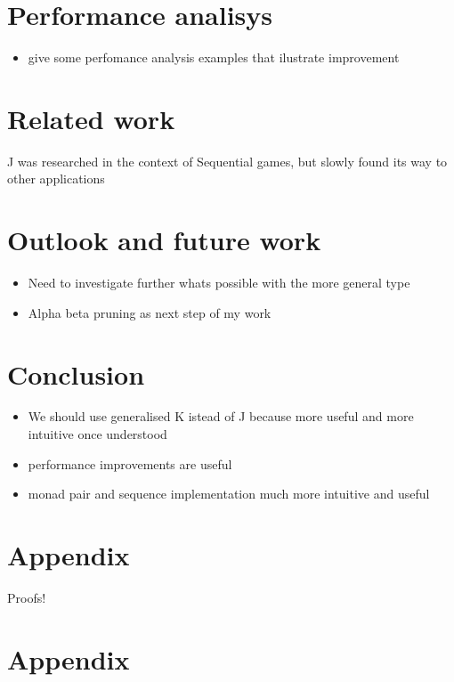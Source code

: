 \documentclass[runningheads]{llncs}
\providecommand{\tightlist}{%
  \setlength{\itemsep}{0pt}\setlength{\parskip}{0pt}}
\begin{document}
\section{Performance analisys}\label{performance-analisys}

\begin{itemize}
\tightlist
\item
  give some perfomance analysis examples that ilustrate improvement
\end{itemize}

\section{Related work}\label{related-work}

J was researched in the context of Sequential games, but slowly found
its way to other applications

\section{Outlook and future work}\label{outlook-and-future-work}

\begin{itemize}
\tightlist
\item
  Need to investigate further whats possible with the more general type
\item
  Alpha beta pruning as next step of my work
\end{itemize}

\section{Conclusion}\label{conclusion}

\begin{itemize}
\tightlist
\item
  We should use generalised K istead of J because more useful and more
  intuitive once understood
\item
  performance improvements are useful
\item
  monad pair and sequence implementation much more intuitive and useful
\end{itemize}

\section{Appendix}\label{appendix}

Proofs!\cite{escardo2010sequential}

%
%
%
% 
% 
%



\newpage
\section*{Appendix}
\appendix
\end{document}
